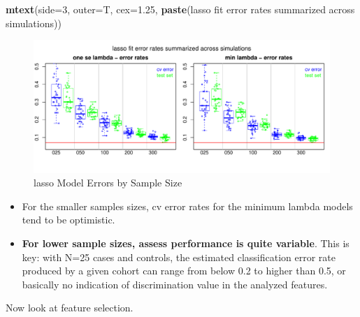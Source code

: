 \documentclass[
]{book}
\newenvironment{Shaded}{\begin{snugshade}}{\end{snugshade}}
\newcommand{\DataTypeTok}[1]{\textcolor[rgb]{0.13,0.29,0.53}{#1}}
\newcommand{\DecValTok}[1]{\textcolor[rgb]{0.00,0.00,0.81}{#1}}
\newcommand{\FloatTok}[1]{\textcolor[rgb]{0.00,0.00,0.81}{#1}}
\newcommand{\KeywordTok}[1]{\textcolor[rgb]{0.13,0.29,0.53}{\textbf{#1}}}
\newcommand{\NormalTok}[1]{#1}
\newcommand{\StringTok}[1]{\textcolor[rgb]{0.31,0.60,0.02}{#1}}
\begin{document}
\begin{Shaded}
\begin{Highlighting}[]
\KeywordTok{mtext}\NormalTok{(}\DataTypeTok{side=}\DecValTok{3}\NormalTok{, }\DataTypeTok{outer=}\NormalTok{T, }\DataTypeTok{cex=}\FloatTok{1.25}\NormalTok{, }\KeywordTok{paste}\NormalTok{(}\StringTok{\textquotesingle{}lasso fit error rates summarized across simulations\textquotesingle{}}\NormalTok{))}
\end{Highlighting}
\end{Shaded}

\begin{figure}
\centering
\includegraphics{Static/figures/hcc5hmC-glmnetSuite-lasso-simRes-errors-overSim-1.pdf}
\caption{\label{fig:hcc5hmC-glmnetSuite-lasso-simRes-errors-overSim}lasso Model Errors by Sample Size}
\end{figure}

\begin{itemize}
\item
  For the smaller samples sizes, cv error rates for the minimum lambda models tend to be
  optimistic.
\item
  \textbf{For lower sample sizes, assess performance is quite variable}. This
  is key: with N=25 cases and controls, the estimated classification error
  rate produced by a given cohort can range from below 0.2 to higher than 0.5,
  or basically no indication of discrimination value in the analyzed features.
\end{itemize}

Now look at feature selection.
\end{document}
